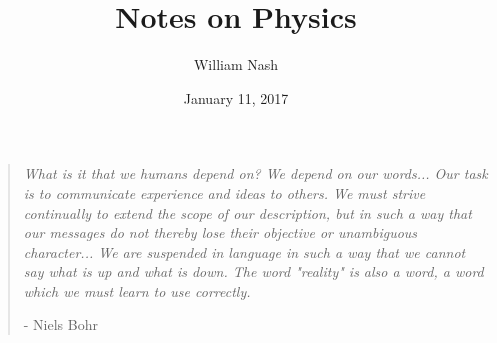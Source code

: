 \documentclass[11pt]{book}
\title{Notes on Physics}
\author{William Nash}
\date{January 11, 2017}
\begin{document}
\maketitle \clearpage

\vspace*{\fill}
\thispagestyle{empty} %
\begin{quotation}
\em %
What is it that we humans depend on? We depend on our words... Our task is to communicate experience and ideas to others. We must strive continually to extend the scope of our description, but in such a way that our messages do not thereby lose their objective or unambiguous character... We are suspended in language in such a way that we cannot say what is up and what is down. The word "reality" is also a word, a word which we must learn to use correctly.

\medskip
\raggedleft
- Niels Bohr
\end{quotation}
\vspace*{\fill}

\tableofcontents








{}

\end{document}
